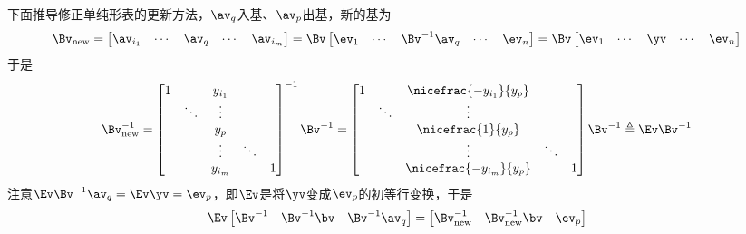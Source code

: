 \documentclass{ctexart}
\begin{document}
下面推导修正单纯形表的更新方法，$\av_q$入基、$\av_p$出基，新的基为
\begin{align*}
    \Bv_{\text{new}} =
    \begin{bmatrix}
        \av_{i_1} & \cdots & \av_q & \cdots & \av_{i_m}
    \end{bmatrix}
    = \Bv \begin{bmatrix}
              \ev_1 & \cdots & \Bv^{-1} \av_q & \cdots & \ev_n
          \end{bmatrix} = \Bv
    \begin{bmatrix}
        \ev_1 & \cdots & \yv & \cdots & \ev_n
    \end{bmatrix}
\end{align*}
于是
\begin{align*}
    \Bv_{\text{new}}^{-1} =
    \begin{bmatrix}
        1 &        & y_{i_1}              \\
          & \ddots & \vdots               \\
          &        & y_{p}                \\
          &        & \vdots  & \ddots     \\
          &        & y_{i_m} &        & 1
    \end{bmatrix}^{-1} \Bv^{-1} =
    \begin{bmatrix}
        1 &        & \nicefrac{-y_{i_1}}{y_{p}}              \\
          & \ddots & \vdots                                  \\
          &        & \nicefrac{1}{y_{p}}                     \\
          &        & \vdots                     & \ddots     \\
          &        & \nicefrac{-y_{i_m}}{y_{p}} &        & 1
    \end{bmatrix} \Bv^{-1} \triangleq \Ev \Bv^{-1}
\end{align*}
注意$\Ev \Bv^{-1} \av_q = \Ev \yv = \ev_p$，即$\Ev$是将$\yv$变成$\ev_p$的初等行变换，于是
\begin{align*}
    \Ev \begin{bmatrix}
            \Bv^{-1} & \Bv^{-1} \bv & \Bv^{-1} \av_q
        \end{bmatrix} = \begin{bmatrix}
                            \Bv_{\text{new}}^{-1} & \Bv_{\text{new}}^{-1} \bv & \ev_p
                        \end{bmatrix}
\end{align*}
\end{document}
